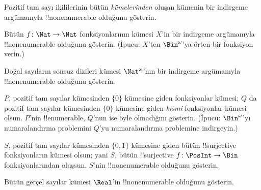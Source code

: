 \begin{prob}
Pozitif tam sayı ikililerinin bütün \emph{kümelerinden} oluşan kümenin bir
indirgeme argümanıyla !!{nonenumerable} olduğunu gösterin.
\end{prob}

\begin{prob}\label{sfr:siz:red:prob:nat-nat}
  Bütün $f\colon\Nat\to\Nat$ fonksiyonlarının kümesi $X$'in bir indirgeme
  argümanıyla !!{nonenumerable} olduğunu gösterin. (İpucu: $X$'ten
  $\Bin^\omega$'ya örten bir fonksiyon verin.)
\end{prob}

\begin{prob}
Doğal sayıların sonsuz dizileri kümesi $\Nat^\omega$'nın bir indirgeme
argümanıyla !!{nonenumerable} olduğunu gösterin.
\end{prob}

\begin{prob}
$P$, pozitif tam sayılar kümesinden $\{0\}$ kümesine giden fonksiyonlar
kümesi; $Q$ da pozitif tam sayılar kümesinden $\{0\}$ kümesine giden
\emph{kısmi} fonksiyonlar kümesi olsun. $P$'nin !!{enumerable}, $Q$'nun ise
öyle olmadığını gösterin. (İpucu: $\Bin^\omega$'yı numaralandırma problemini
$Q$'yu numaralandırma problemine indirgeyin.)
\end{prob}

\begin{prob}
$S$, pozitif tam sayılar kümesinden $\{0,1\}$ kümesine giden bütün
!!{surjective} fonksiyonların kümesi olsun; yani $S$, bütün !!{surjective}
$f\colon\PosInt\to\Bin$ fonksiyonlarından oluşsun. $S$'nin
!!{nonenumerable} olduğunu gösterin.
\end{prob}

\begin{prob}
Bütün gerçel sayılar kümesi $\Real$'in !!{nonenumerable} olduğunu gösterin.
\end{prob}

